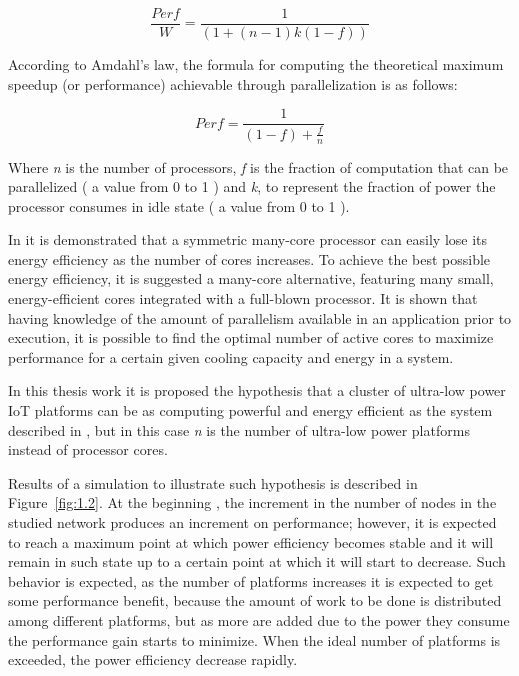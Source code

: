 \begin{equation}\label{eq:1} \frac{Perf}{W} = \frac{1}{(1 + (n -1 ) k (1 - f))}
\end{equation}

According to Amdahl's law\cite{Dong}, the formula for computing the theoretical
maximum speedup (or performance) achievable through parallelization is as
follows: 

\begin{equation}\label{eq:2} Perf = \frac{1}{(1 -f) + \frac{f}{n}}
\end{equation}

Where \textit{n} is the number of processors,  \textit{f} is the fraction of
computation that can be parallelized ( a value from 0 to 1 ) and \textit{k}, to
represent the fraction of power the processor consumes in idle state  ( a value
from 0 to 1 ).

In \cite{Dong} it is demonstrated that a symmetric many-core
processor can easily  lose its energy efficiency as the number of cores
increases. To achieve the  best possible energy efficiency, it is 
suggested a many-core alternative, featuring many small, energy-efficient cores
integrated with a full-blown processor. It is shown that having knowledge of
the amount of parallelism available in an application prior to execution, it is
possible to  find the optimal number of active cores to maximize performance
for a certain given cooling capacity and energy in a system.

In this thesis work it is proposed the hypothesis that a cluster of ultra-low
power IoT platforms can be as computing powerful and energy efficient as the
system described in \cite{Dong}, but in this case \textit{n} is the number of
ultra-low power platforms instead of processor cores.

Results of a simulation to illustrate such hypothesis is described in
Figure~\ref{fig:1.2}.  At the beginning , the increment in the number of nodes
in the studied network produces an increment on performance; however, it is
expected to reach a maximum point at which power efficiency becomes stable and
it will remain in such state up to a certain point at which it will start to
decrease. Such behavior is expected, as the number of platforms increases it is
expected to get some performance benefit, because the amount of work to be done
is distributed among different platforms, but as more are added due to the
power they consume the performance gain starts to minimize. When the ideal
number of platforms is exceeded, the power efficiency decrease rapidly.

